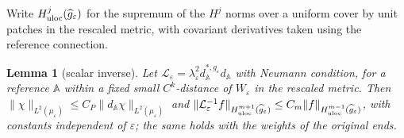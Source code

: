 \documentclass[11pt]{amsart}
\newtheorem{lemma}[theorem]{Lemma}
\theoremstyle{definition}
\theoremstyle{remark}
\theoremstyle{plain}
\numberwithin{equation}{section}
\newcommand{\eps}{\varepsilon}
\begin{document}
Write $H^j_{\rm uloc}(\widehat g_\eps)$ for the supremum of the
$H^j$ norms over a uniform cover by unit patches in the rescaled
metric, with covariant derivatives taken using the reference
connection.

\begin{lemma}[scalar inverse]\label{lem:scalar-inverse}
Let $\mathcal L_\eps=\lambda_\eps^2d^{*,g_\eps}_{\mathbb A}d_{\mathbb A}$ with Neumann condition, for a
reference $\mathbb A$ within a fixed small $C^k$-distance of $W_\eps$ in the rescaled
metric. Then
$\|\chi\|_{L^2(\mu_\eps)}\le C_P\|d_{\mathbb A}\chi\|_{L^2(\mu_\eps)}$ and
$\|\mathcal L_\eps^{-1}f\|_{H^{m+1}_{\rm uloc}(\widehat g_\eps)}\le C_m\|f\|_{H^{m-1}_{\rm
uloc}(\widehat g_\eps)}$, with constants independent of $\eps$; the same holds
with the weights of the original ends.
\end{lemma}
\end{document}
